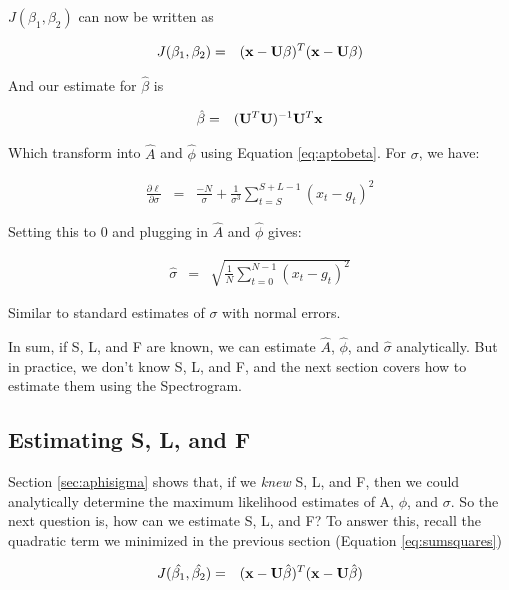 \documentclass[11pt]{article}
\theoremstyle{plain}
\theoremstyle{definition}
\begin{document}
\noindent $J(\beta_1, \beta_2)$ can now be written as

\begin{eqnarray}
	\label{eq:sumsquares}
	J(\beta_1, \beta_2) &=& ({\bf x} - {\bf U} {\bf \beta})^T ({\bf x} - {\bf U} {\bf \beta}) 
\end{eqnarray}

\noindent And our estimate for $\hat{\beta}$ is

\begin{eqnarray}
\label{eq:betahat}
	\hat{\beta} &=& ({\bf U}^T {\bf U})^{-1} {\bf U}^T {\bf x} 
\end{eqnarray}

\noindent Which transform into $\hat{A}$ and $\hat{\phi}$ using Equation \ref{eq:aptobeta}. For $\sigma$, we have:

\begin{eqnarray}
	\frac{\partial \ell}{\partial \sigma} &=& \frac{-N}{\sigma} + \frac{1}{\sigma^3} \sum_{t=S}^{S+L-1} (x_t - g_t)^2
\end{eqnarray}

\noindent Setting this to $0$ and plugging in $\hat{A}$ and $\hat{\phi}$ gives:

\begin{eqnarray}
	\hat{\sigma} &=& \sqrt{\frac{1}{N} \sum_{t=0}^{N-1} (x_t - g_t)^2}
\end{eqnarray}

\noindent Similar to standard estimates of $\sigma$ with normal errors. 	

In sum, if S, L, and F are known, we can estimate $\hat{A}$, $\hat{\phi}$, and $\hat{\sigma}$ analytically. But in practice, we don't know S, L, and F, and the next section covers how to estimate them using the Spectrogram. 

\subsection{Estimating S, L, and F}
\label{sec:slf}
Section \ref{sec:aphisigma} shows that, if we {\it knew} S, L, and F, then we could analytically determine the maximum likelihood estimates of A, $\phi$, and $\sigma$. So the next question is, how can we estimate S, L, and F? To answer this, recall the quadratic term we minimized in the previous section (Equation \ref{eq:sumsquares})

\begin{eqnarray}
	J(\hat{\beta_1}, \hat{\beta_2}) &=& ({\bf x} - {\bf U} \hat{\beta})^T ({\bf x} - {\bf U} \hat{\beta})
\end{eqnarray}
\end{document}
